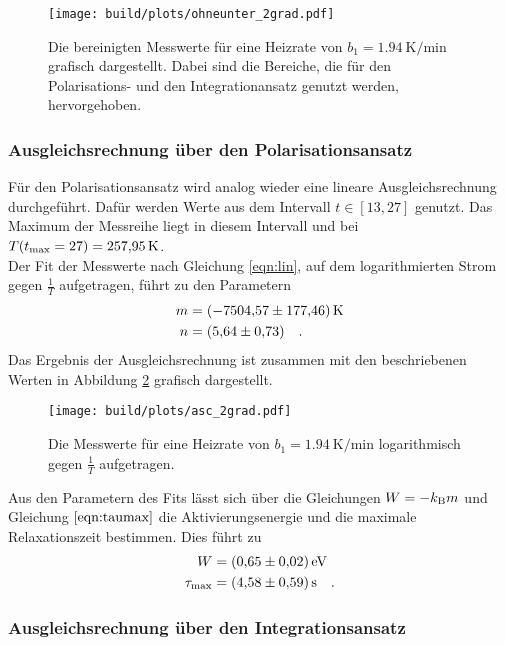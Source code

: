 \begin{figure}[h]
  \centering
  \texttt{[image: build/plots/ohneunter\_2grad.pdf]}
  \caption{Die bereinigten Messwerte für eine Heizrate von $b_1 = \SI{1.94}{\kelvin\per\minute}$ grafisch dargestellt.
  Dabei sind die Bereiche, die für den Polarisations- und den Integrationansatz genutzt werden, hervorgehoben.}
  \label{img:ohneunter2}
\end{figure}

\subsubsection{Ausgleichsrechnung über den Polarisationsansatz}

\noindent
Für den Polarisationsansatz wird analog wieder eine lineare Ausgleichsrechnung durchgeführt.
Dafür werden Werte aus dem Intervall $t \in [13,27]$ genutzt.
Das Maximum der Messreihe liegt in diesem Intervall und bei $T(t_\t{max} = 27) = \SI{257.95}{\kelvin}$. \\
Der Fit der Messwerte nach Gleichung \ref{eqn:lin}, auf dem logarithmierten Strom gegen $\frac{1}{T}$ aufgetragen, führt zu den Parametern
\begin{align*}
  m & = \SI{ -7504.57( 17746)}{\kelvin}\\
  n & = \SI{5.64(073)}{} \quad .
\end{align*}
Das Ergebnis der Ausgleichsrechnung ist zusammen mit den beschriebenen Werten in Abbildung \ref{img:pol2} grafisch dargestellt.

\begin{figure}[ht]
  \centering
  \texttt{[image: build/plots/asc\_2grad.pdf]}
  \caption{Die Messwerte für eine Heizrate von $b_1 = \SI{1.94}{\kelvin\per\minute}$ 
          logarithmisch gegen $\frac{1}{T}$ aufgetragen.}
  \label{img:pol2}
\end{figure}

\noindent
Aus den Parametern des Fits lässt sich über die Gleichungen $W = -k_\t{B} m$ und Gleichung $\ref{eqn:taumax}$ die Aktivierungsenergie und die maximale Relaxationszeit bestimmen.
Dies führt zu 
\begin{align*}
  W &= \SI{0.65 (002)}{\electronvolt}\\
  \tau_\t{max} &= \SI{4.58 (059)}{\second} \quad .
\end{align*}



\subsubsection{Ausgleichsrechnung über den Integrationsansatz}

